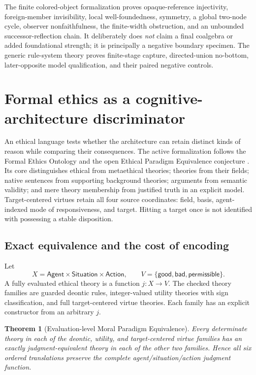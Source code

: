 \documentclass[11pt]{article}
\newtheorem{theorem}{Theorem}
\theoremstyle{definition}
\theoremstyle{remark}
\begin{document}
The finite colored-object formalization proves opaque-reference injectivity,
foreign-member invisibility, local well-foundedness, symmetry, a global two-node
cycle, observer nonfaithfulness, the finite-width obstruction, and an unbounded
successor-reflection chain.  It deliberately does \emph{not} claim a final
coalgebra or added foundational strength; it is principally a negative boundary
specimen.  The generic rule-system theory proves finite-stage capture,
directed-union no-bottom, later-opposite model qualification, and their paired
negative controls.

\section{Formal ethics as a cognitive-architecture discriminator}

An ethical language tests whether the architecture can retain distinct kinds of
reason while comparing their consequences.  The active formalization follows
the Formal Ethics Ontology and the open Ethical Paradigm Equivalence conjecture
\cite{FormalEthicsOntology,GoertzelMPE,GoertzelTCVE}.  Its core distinguishes ethical from
metaethical theories; theories from their fields; native sentences from
supporting background theories; arguments from semantic validity; and mere
theory membership from justified truth in an explicit model.  Target-centered
virtues retain all four source coordinates: field, basis, agent-indexed mode of
responsiveness, and target.  Hitting a target once is not identified with
possessing a stable disposition.

\subsection{Exact equivalence and the cost of encoding}

Let
\[
  X=\mathsf{Agent}\times\mathsf{Situation}\times\mathsf{Action},
  \qquad
  V=\{\mathsf{good},\mathsf{bad},\mathsf{permissible}\}.
\]
A fully evaluated ethical theory is a function $j:X\to V$.  The checked theory
families are guarded deontic rules, integer-valued utility theories with sign
classification, and full target-centered virtue theories.  Each family has an
explicit constructor from an arbitrary $j$.

\begin{theorem}[Evaluation-level Moral Paradigm Equivalence]
Every determinate theory in each of the deontic, utility, and target-centered
virtue families has an exactly judgment-equivalent theory in each of the other
two families.  Hence all six ordered translations preserve the complete
agent/situation/action judgment function.
\end{theorem}
\end{document}
